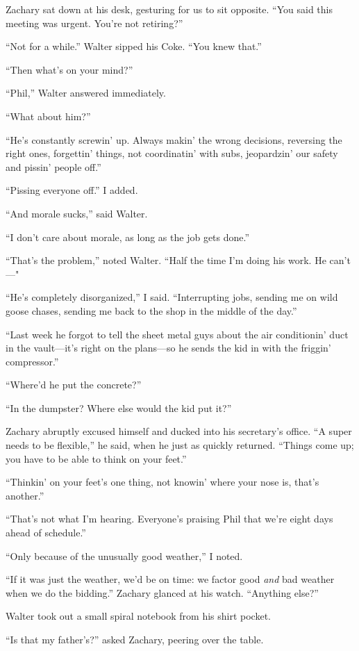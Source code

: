 Zachary sat down at his desk, gesturing for us to sit opposite. ``You
said this meeting was urgent. You're not retiring?''

``Not for a while.'' Walter sipped his Coke. ``You knew that.''

``Then what's on your mind?''

``Phil,'' Walter answered immediately.

``What about him?''

``He's constantly screwin' up. Always makin' the wrong decisions,
reversing the right ones, forgettin' things, not coordinatin' with subs,
jeopardzin' our safety and pissin' people off.''

``Pissing everyone off.'' I added.

``And morale sucks,'' said Walter.

``I don't care about morale, as long as the job gets done.''

``That's the problem,'' noted Walter. ``Half the time I'm doing his
work. He can't---"

``He's completely disorganized,'' I said. ``Interrupting jobs, sending
me on wild goose chases, sending me back to the shop in the middle of
the day.''

``Last week he forgot to tell the sheet metal guys about the air
conditionin' duct in the vault---it's right on the plans---so he sends
the kid in with the friggin' compressor.''

``Where'd he put the concrete?''

``In the dumpster? Where else would the kid put it?''

Zachary abruptly excused himself and ducked into his secretary's office.
``A super needs to be flexible,'' he said, when he just as quickly
returned. ``Things come up; you have to be able to think on your feet.''

``Thinkin' on your feet's one thing, not knowin' where your nose is,
that's another.''

``That's not what I'm hearing. Everyone's praising Phil that we're eight
days ahead of schedule.''

``Only because of the unusually good weather,'' I noted.

``If it was just the weather, we'd be on time: we factor good \emph{and}
bad weather when we do the bidding.'' Zachary glanced at his watch.
``Anything else?''

Walter took out a small spiral notebook from his shirt pocket.

``Is that my father's?'' asked Zachary, peering over the table.

